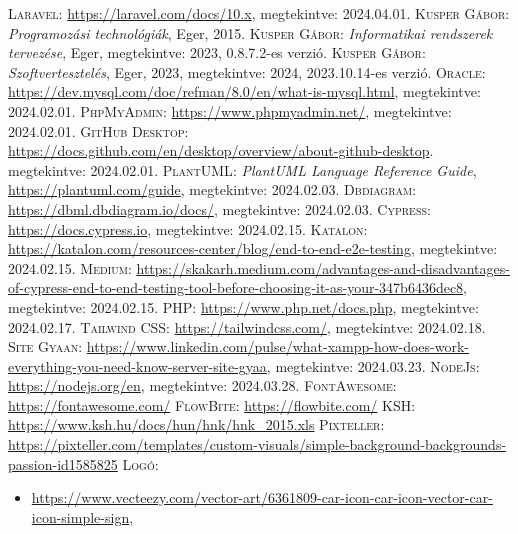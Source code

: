 \documentclass[]{thesis-ekf}
\theoremstyle{definition}
\theoremstyle{remark}
\begin{document}
	
	\begin{thebibliography}{2}
		\textsc{Laravel:} \url{https://laravel.com/docs/10.x},  megtekintve: 2024.04.01.
		\textsc{Kusper Gábor}: \emph{Programozási technológiák}, Eger, 2015.
		\textsc{Kusper Gábor}: \emph{Informatikai rendszerek tervezése}, Eger, megtekintve: 2023, 0.8.7.2-es verzió.
		\textsc{Kusper Gábor}: \emph{Szoftvertesztelés}, Eger, 2023, megtekintve: 2024, 2023.10.14-es verzió.
		\textsc{Oracle}: \url{https://dev.mysql.com/doc/refman/8.0/en/what-is-mysql.html}, megtekintve: 2024.02.01.
		\textsc{PhpMyAdmin}: \url{https://www.phpmyadmin.net/}, megtekintve: 2024.02.01.
		\textsc{GitHub Desktop}: \url{https://docs.github.com/en/desktop/overview/about-github-desktop}. megtekintve: 2024.02.01.
		\textsc{PlantUML}: \emph{PlantUML Language Reference Guide}, \url{https://plantuml.com/guide}, megtekintve: 2024.02.03.
		\textsc{Dbdiagram}: \url{https://dbml.dbdiagram.io/docs/},  megtekintve: 2024.02.03.
		\textsc{Cypress}: \url{https://docs.cypress.io},  megtekintve: 2024.02.15.
		\textsc{Katalon}: \url{https://katalon.com/resources-center/blog/end-to-end-e2e-testing},  megtekintve: 2024.02.15.
		\textsc{Medium}: \url{https://skakarh.medium.com/advantages-and-disadvantages-of-cypress-end-to-end-testing-tool-before-choosing-it-as-your-347b6436dec8}, megtekintve: 2024.02.15.
		\textsc{PHP}: \url{https://www.php.net/docs.php},  megtekintve: 2024.02.17.
		\textsc{Tailwind CSS}: \url{https://tailwindcss.com/}, megtekintve: 2024.02.18.
		\textsc{Site Gyaan}: \url{https://www.linkedin.com/pulse/what-xampp-how-does-work-everything-you-need-know-server-site-gyaa}, megtekintve: 2024.03.23.
		\textsc{NodeJs}: \url{https://nodejs.org/en}, megtekintve: 2024.03.28.
		\textsc{FontAwesome}: \url{https://fontawesome.com/}
		\textsc{FlowBite}: \url{https://flowbite.com/}
		\textsc{KSH}: \url{https://www.ksh.hu/docs/hun/hnk/hnk_2015.xls}
		\textsc{Pixteller}: \url{https://pixteller.com/templates/custom-visuals/simple-background-backgrounds-passion-id1585825}
		\textsc{Logó}:
			\begin{itemize}
				\item \url{https://www.vecteezy.com/vector-art/6361809-car-icon-car-icon-vector-car-icon-simple-sign},

\end{itemize}
\end{thebibliography}
\end{document}
